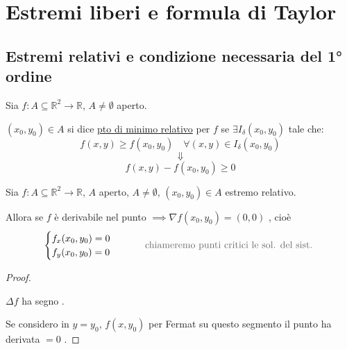 
\section{Estremi liberi e formula di Taylor}

\subsection{Estremi relativi e condizione necessaria del 1° ordine}

\begin{definition}
Sia $f : A \subseteq \mathbb{R}^2 \to \mathbb{R}$, $A \neq \emptyset$ aperto.

$(x_0, y_0) \in A$ si dice \underline{pto di minimo relativo} per $f$ se $\exists I_\delta(x_0, y_0)$ tale che:
\[
f(x, y) \ge f(x_0, y_0) \quad \forall (x, y) \in I_\delta(x_0, y_0)
\]
\[
\Downarrow
\]
\[
f(x, y) - f(x_0, y_0) \ge 0
\]
\end{definition}

\begin{theorem}
Sia $f : A \subseteq \mathbb{R}^2 \to \mathbb{R}$, $A$ aperto, $A \neq \emptyset$, $(x_0, y_0) \in A$ estremo relativo.

Allora se $f$ è derivabile nel punto $\implies \nabla f(x_0, y_0) = (0, 0)$ , cioè
\[
\begin{cases}
f_x(x_0, y_0) = 0 \\
f_y(x_0, y_0) = 0
\end{cases} \qquad \text{\pencilnote{chiameremo punti critici le sol. del sist.}}
\]
\end{theorem}

\begin{proof}
\begin{center}
\end{center}
$\Delta f$ ha segno .

Se considero in $y = y_0$, $f(x, y_0)$ per Fermat su questo segmento il punto ha derivata $= 0$ .
\end{proof}

